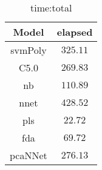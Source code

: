 \begin{table}[!ht]
	\centering
	\begin{tabular}{|c|c|}
		\hline
		Model & elapsed \\ \hline
		svmPoly & $325.11$ \\ \hline
		C5.0 & $269.83$ \\ \hline
		nb & $110.89$ \\ \hline
		nnet & $428.52$ \\ \hline
		pls & $22.72$ \\ \hline
		fda & $69.72$ \\ \hline
		pcaNNet & $276.13$ \\ \hline
	\end{tabular}
	\caption{time:total}
	\label{tab:time:total}
\end{table}
